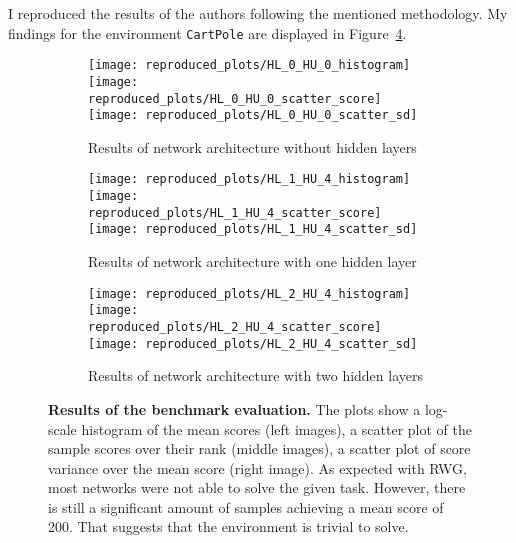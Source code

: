 I reproduced the results of the authors following the mentioned methodology. My findings for the environment \verb|CartPole| are displayed in Figure~\ref{fig:plots_reproduced}.
\begin{figure}[ht]
\centering
\begin{subfigure}{\textwidth}
  \centering
  \texttt{[image: reproduced\_plots/HL\_0\_HU\_0\_histogram]}
  \texttt{[image: reproduced\_plots/HL\_0\_HU\_0\_scatter\_score]}
  \texttt{[image: reproduced\_plots/HL\_0\_HU\_0\_scatter\_sd]}
    \caption{Results of network architecture without hidden layers}
    \label{fig:plots_reproduced_first}
\end{subfigure}
\begin{subfigure}{\textwidth}
  \centering
  \texttt{[image: reproduced\_plots/HL\_1\_HU\_4\_histogram]}
  \texttt{[image: reproduced\_plots/HL\_1\_HU\_4\_scatter\_score]}
  \texttt{[image: reproduced\_plots/HL\_1\_HU\_4\_scatter\_sd]}
    \caption{Results of network architecture with one hidden layer}
    \label{fig:plots_reproduced_second}
\end{subfigure}
\begin{subfigure}{\textwidth}
  \centering
  \texttt{[image: reproduced\_plots/HL\_2\_HU\_4\_histogram]}
  \texttt{[image: reproduced\_plots/HL\_2\_HU\_4\_scatter\_score]}
  \texttt{[image: reproduced\_plots/HL\_2\_HU\_4\_scatter\_sd]}
    \caption{Results of network architecture with two hidden layers}
    \label{fig:plots_reproduced_third}
\end{subfigure}
\caption[Reproduced Plots]{
  \textbf{Results of the benchmark evaluation.}
   The plots show a log-scale histogram of the mean scores (left images), a scatter plot of the sample scores over their rank (middle images), a scatter plot of score variance over the mean score (right image). As expected with RWG, most networks were not able to solve the given task. However, there is still a significant amount of samples achieving a mean score of 200. That suggests that the environment is trivial to solve.
}
\label{fig:plots_reproduced}
\end{figure}
